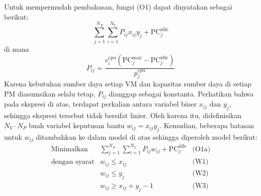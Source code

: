 Untuk mempermudah pembahasan, fungsi (O1) dapat dinyatakan sebagai berikut:
\begin{equation*}
\displaystyle \sum_{j=1}^{N_P}\sum_{i=1}^{N_V}P_{ij}x_{ij}y_j+\text{PC}_j^\text{idle}
\end{equation*}
di mana
\begin{equation*}
P_{ij}=\displaystyle\frac{v_i^\text{cpu}(\text{PC}_j^\max-\text{PC}_j^\text{idle})}{p_j^\text{cpu}}
\end{equation*}
Karena kebutuhan sumber daya setiap VM dan kapasitas sumber daya di setiap PM diasumsikan selalu tetap, $P_{ij}$ dianggap sebagai konstanta.
Perhatikan bahwa pada ekspresi di atas, terdapat perkalian antara variabel biner $x_{ij}$ dan $y_j$, sehingga ekspresi tersebut tidak bersifat linier. Oleh karena itu, didefinisikan $N_V\cdot N_P$ buah variabel keputusan bantu $w_{ij}=x_{ij}y_j$. Kemudian, beberapa batasan untuk $w_{ij}$ ditambahkan ke dalam model di atas sehingga diperoleh model berikut:
\begin{equation*}
\begin{array}{rlll}
\text{Minimalkan} & \displaystyle \sum_{j=1}^{N_P}\sum_{i=1}^{N_V}P_{ij}w_{ij}+\text{PC}_j^\text{idle} & \text{(O1a)}\\
\text{dengan syarat} & w_{ij} \leq x_{ij} & \text{(W1)}\\
& w_{ij} \leq y_{j}& \text{(W2)}\\
& w_{ij} \geq x_{ij} + y_j - 1& \text{(W3)}\\
\end{array}
\end{equation*}
